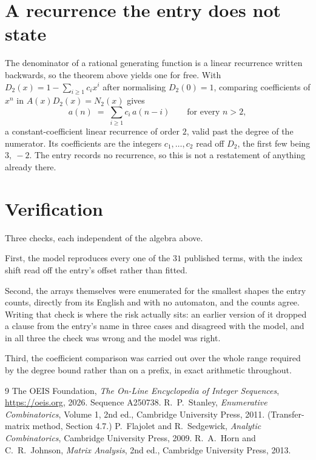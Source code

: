 \documentclass[11pt,a4paper]{article}
\theoremstyle{plain}
\theoremstyle{definition}
\begin{document}
\section{A recurrence the entry does not state}

The denominator of a rational generating function is a linear recurrence written backwards, so
the theorem above yields one for free. With $D_2(x)=1-\sum_{i\ge1}c_ix^i$ after normalising
$D_2(0)=1$, comparing coefficients of $x^n$ in $A(x)D_2(x)=N_2(x)$ gives
\[
a(n)\;=\;\sum_{i\ge1}c_i\,a(n-i)\qquad\text{for every }n>2,
\]
a constant-coefficient linear recurrence of order $2$, valid past the degree of the
numerator. Its coefficients are the integers $c_1,\dots,c_{2}$ read off $D_2$, the first few being $3,\ -2$. The entry records no recurrence, so this is not a restatement of anything
already there.

\section{Verification}

Three checks, each independent of the algebra above.

First, the model reproduces every one of the $31$ published terms, with the index shift
read off the entry's offset rather than fitted.

Second, the arrays themselves were enumerated for the smallest shapes the entry counts,
directly from its English and with no automaton, and the counts agree. Writing that check is
where the risk actually sits: an earlier version of it dropped a clause from the entry's name
in three cases and disagreed with the model, and in all three the check was wrong and the model
was right.

Third, the coefficient comparison was carried out over the whole range required by the degree
bound rather than on a prefix, in exact arithmetic throughout.

\begin{thebibliography}{9}
 The OEIS Foundation, \emph{The On-Line Encyclopedia of Integer
Sequences}, \url{https://oeis.org}, 2026. Sequence A250738.
 R.~P.~Stanley, \emph{Enumerative Combinatorics}, Volume 1, 2nd ed.,
Cambridge University Press, 2011. (Transfer-matrix method, Section 4.7.)
 P.~Flajolet and R.~Sedgewick, \emph{Analytic Combinatorics}, Cambridge
University Press, 2009.
 R.~A.~Horn and C.~R.~Johnson, \emph{Matrix Analysis}, 2nd ed., Cambridge
University Press, 2013.
\end{thebibliography}
\end{document}
